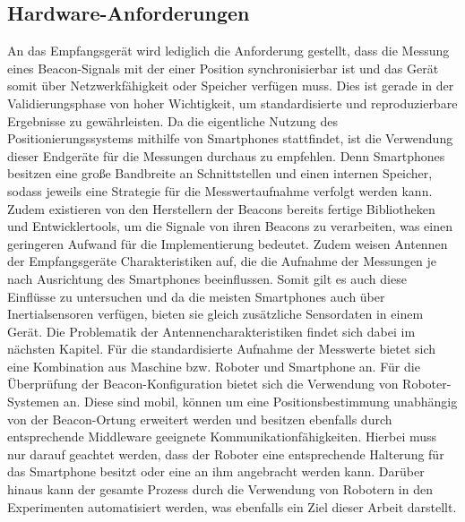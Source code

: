 \subsection{Hardware-Anforderungen}
An das Empfangsgerät wird lediglich die Anforderung gestellt, dass die Messung eines Beacon-Signals mit der einer Position synchronisierbar ist und das Gerät somit über Netzwerkfähigkeit oder Speicher verfügen muss. Dies ist gerade in der Validierungsphase von hoher Wichtigkeit, um standardisierte und reproduzierbare Ergebnisse zu gewährleisten. Da die eigentliche Nutzung des Positionierungssystems mithilfe von Smartphones stattfindet, ist die Verwendung dieser Endgeräte für die Messungen durchaus zu empfehlen. Denn Smartphones besitzen eine große Bandbreite an Schnittstellen und einen internen Speicher, sodass jeweils eine Strategie für die Messwertaufnahme verfolgt werden kann. Zudem existieren von den Herstellern der Beacons bereits fertige Bibliotheken und Entwicklertools, um die Signale von ihren Beacons zu verarbeiten, was einen geringeren Aufwand für die Implementierung bedeutet. Zudem weisen Antennen der Empfangsgeräte Charakteristiken auf, die die Aufnahme der Messungen je nach Ausrichtung des Smartphones beeinflussen. Somit gilt es auch diese Einflüsse zu untersuchen und da die meisten Smartphones auch über Inertialsensoren verfügen, bieten sie gleich zusätzliche Sensordaten in einem Gerät. Die Problematik der Antennencharakteristiken findet sich dabei im nächsten Kapitel. Für die standardisierte Aufnahme der Messwerte bietet sich eine Kombination aus Maschine bzw. Roboter und Smartphone an. Für die Überprüfung der Beacon-Konfiguration bietet sich die Verwendung von Roboter-Systemen an. Diese sind mobil, können um eine Positionsbestimmung unabhängig von der Beacon-Ortung erweitert werden und besitzen ebenfalls durch entsprechende Middleware geeignete Kommunikationfähigkeiten. Hierbei muss nur darauf geachtet werden, dass der Roboter eine entsprechende Halterung für das Smartphone besitzt oder eine an ihm angebracht werden kann. Darüber hinaus kann der gesamte Prozess durch die Verwendung von Robotern in den Experimenten automatisiert werden, was ebenfalls ein Ziel dieser Arbeit darstellt.  
